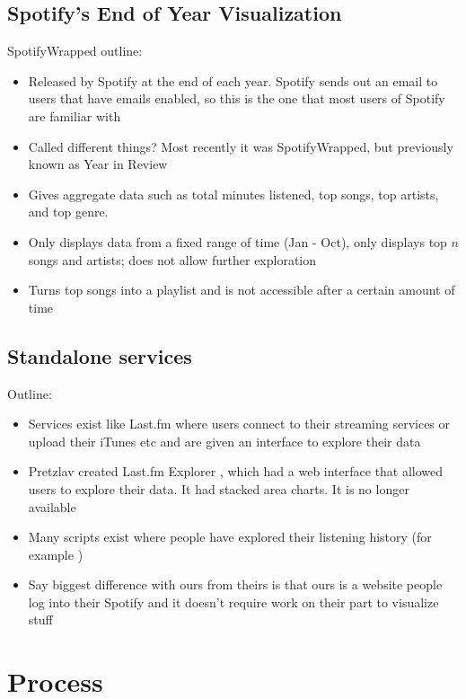\documentclass[journal]{vgtc}                %
\begin{document}
\subsection{Spotify's End of Year Visualization}

SpotifyWrapped outline:\cite{Spo18}
\begin{itemize}
  \item Released by Spotify at the end of each year. Spotify sends out an email to users that have emails enabled, so this is the one that most users of Spotify are familiar with
  \item Called different things? Most recently it was SpotifyWrapped, but previously known as Year in Review
  \item Gives aggregate data such as total minutes listened, top songs, top artists, and top genre.
  \item Only displays data from a fixed range of time (Jan - Oct), only displays top $n$ songs and artists; does not allow further exploration
  \item Turns top songs into a playlist and is not accessible after a certain amount of time
\end{itemize}

\subsection{Standalone services}

Outline:
\begin{itemize}
  \item Services exist like Last.fm where users connect to their streaming services or upload their iTunes etc and are given an interface to explore their data
  \item Pretzlav created Last.fm Explorer \cite{Pre08}, which had a web interface that allowed users to explore their data. It had stacked area charts. It is no longer available
  \item Many scripts exist where people have explored their listening history (for example \cite{Boe16})
  \item Say biggest difference with ours from theirs is that ours is a website people log into their Spotify and it doesn't require work on their part to visualize stuff
\end{itemize}

\section{Process}
\end{document}
